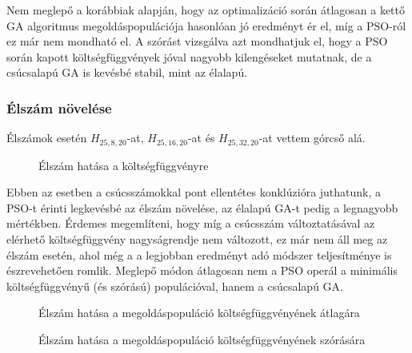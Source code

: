 Nem meglepő a korábbiak alapján, hogy az optimalizáció során átlagosan a kettő GA algoritmus megoldáspopulációja hasonlóan jó eredményt ér el, míg a PSO-ról ez már nem mondható el. A szórást vizsgálva azt mondhatjuk el, hogy a PSO során kapott költségfüggvények jóval nagyobb kilengéseket mutatnak, de a csúcsalapú GA is kevésbé stabil, mint az élalapú.

\subsubsection{Élszám növelése}

Élszámok esetén $H_{25,8,20}$-at, $H_{25,16,20}$-at és $H_{25,32,20}$-at vettem górcső alá.

\begin{figure}[H]
	\centering
	\hspace{5pt}
	\hspace{5pt}
	\caption{Élszám hatása a költségfüggvényre}
\end{figure}

Ebben az esetben a csúcsszámokkal pont ellentétes konklúzióra juthatunk, a PSO-t érinti legkevésbé az élszám növelése, az élalapú GA-t pedig a legnagyobb mértékben. Érdemes megemlíteni, hogy míg a csúcsszám változtatásával az elérhető költségfüggvény nagyságrendje nem változott, ez már nem áll meg az élszám esetén, ahol még a a legjobban eredményt adó módszer teljesítménye is észrevehetően romlik. Meglepő módon átlagosan nem a PSO operál a minimális költségfüggvényű (és szórású) populációval, hanem a csúcsalapú GA.

\begin{figure}[H]
	\centering
	\hspace{5pt}
	\hspace{5pt}
	\caption{Élszám hatása a megoldáspopuláció költségfüggvényének átlagára}
\end{figure}

\begin{figure}[H]
	\centering
	\hspace{5pt}
	\hspace{5pt}
	\caption{Élszám hatása a megoldáspopuláció költségfüggvényének szórására}
\end{figure}


